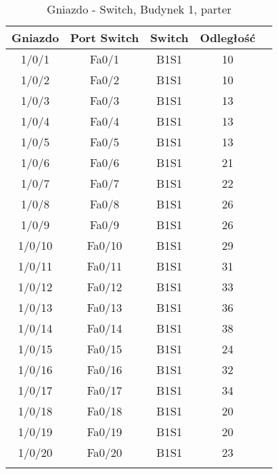 
\begin{center}
    \begin{longtable}{|c|c|c|c|c|}

    \hline
    Gniazdo & Port Switch & Switch & Odległość \\ \hline
	1/0/1 & Fa0/1 & B1S1 & 10 \\ \hline
	1/0/2 & Fa0/2 & B1S1 & 10 \\ \hline
	1/0/3 & Fa0/3 & B1S1 & 13 \\ \hline
	1/0/4 & Fa0/4 & B1S1 & 13 \\ \hline
	1/0/5 & Fa0/5 & B1S1 & 13 \\ \hline
	1/0/6 & Fa0/6 & B1S1 & 21 \\ \hline
	1/0/7 & Fa0/7 & B1S1 & 22 \\ \hline
	1/0/8 & Fa0/8 & B1S1 & 26 \\ \hline
	1/0/9 & Fa0/9 & B1S1 & 26 \\ \hline
	1/0/10 & Fa0/10 & B1S1 & 29 \\ \hline
	1/0/11 & Fa0/11 & B1S1 & 31 \\ \hline
	1/0/12 & Fa0/12 & B1S1 & 33 \\ \hline
	1/0/13 & Fa0/13 & B1S1 & 36 \\ \hline
	1/0/14 & Fa0/14 & B1S1 & 38 \\ \hline
	1/0/15 & Fa0/15 & B1S1 & 24 \\ \hline
	1/0/16 & Fa0/16 & B1S1 & 32 \\ \hline
	1/0/17 & Fa0/17 & B1S1 & 34 \\ \hline
	1/0/18 & Fa0/18 & B1S1 & 20 \\ \hline
	1/0/19 & Fa0/19 & B1S1 & 20 \\ \hline
	1/0/20 & Fa0/20 & B1S1 & 23 \\ \hline

\caption{Gniazdo - Switch, Budynek 1, parter}\\
    \end{longtable}
\end{center}



